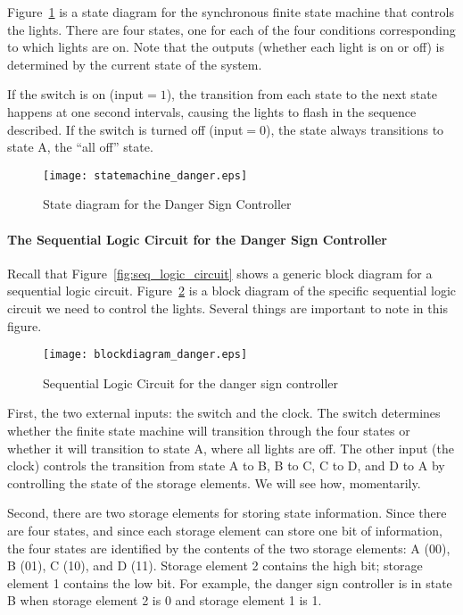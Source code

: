 \documentclass{patt}
\begin{document}
Figure~\ref{fig:statemachine_danger} is a state diagram for the synchronous
finite state machine that controls the lights.  There are four states, one for
each of the four conditions corresponding to which lights are on.  Note that 
the outputs (whether each light is on or off) is determined by the current 
state of the system.

If the switch is on (input${}= 1$), the transition from each state to the next 
state happens at one second intervals, causing the lights to flash in the 
sequence described.  If the switch is turned off (input${}= 0$), the state 
always transitions to state A, the ``all off'' state.

\begin{figure}
\centerline{\texttt{[image: statemachine\_danger.eps]}}
\caption{State diagram for the Danger Sign Controller}
\label{fig:statemachine_danger}
\vspace{-6pt}
\end{figure}

\FloatBarrier

\paragraph{The Sequential Logic Circuit for the Danger Sign Controller}

Recall that Figure~\ref{fig:seq_logic_circuit} shows a generic block diagram
for a sequential logic circuit.  Figure~\ref{fig:blockdiagram_danger}
is a block diagram of the specific sequential logic circuit we need to control
the lights.  Several things are important to note in this figure.  

\begin{figure}
\centerline{\texttt{[image: blockdiagram\_danger.eps]}}
\caption{Sequential Logic Circuit for the danger sign controller}
\label{fig:blockdiagram_danger}
\vspace{-6pt}
\end{figure}

First, the two external inputs: the switch and the clock.  
The switch determines whether the finite state machine will transition
through the four states or whether it will transition to state A, where all
lights are off.  The other input (the clock) controls the transition from 
state A to B, B to C, C to D, and D to A by controlling the state of
the storage elements.  We will see how, momentarily.

Second, there are two storage elements for storing state information.  Since
there are four states, and since each storage element can store one bit of
information, the four states are identified by the contents of the two storage
elements: A (00), B (01), C (10), and D (11).  Storage element 2 contains the 
high bit; storage element 1 contains the low bit.  For example, the danger sign
controller is in state B when storage element 2 is 0 and storage element 1
is 1.  
\end{document}
